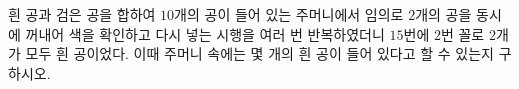 흰 공과 검은 공을 합하여 $10$개의 공이 들어 있는 주머니에서 임의로 $2$개의 공을 동시에 꺼내어 색을 확인하고 다시 넣는 시행을 여러 번 반복하였더니 $15$번에 $2$번 꼴로 $2$개가 모두 흰 공이었다. 이때 주머니 속에는 몇 개의 흰 공이 들어 있다고 할 수 있는지 구하시오.
